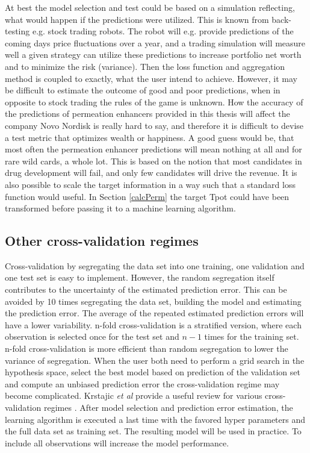 At best the model selection and test could be based on a simulation reflecting, what would happen if the predictions were utilized. This is known from back-testing e.g. stock trading robots. The robot will e.g. provide predictions of the coming days price fluctuations over a year, and a trading simulation will measure well a given strategy can utilize these predictions to increase portfolio net worth and to minimize the risk (variance). Then the loss function and aggregation method is coupled to exactly, what the user intend to achieve. However, it may be difficult to estimate the outcome of good and poor predictions, when in opposite to stock trading the rules of the game is unknown. How the accuracy of the predictions of permeation enhancers provided in this thesis will affect the company Novo Nordisk is really hard to say, and therefore it is difficult to devise a test metric that optimizes wealth or happiness. A good guess would be, that most often the permeation enhancer predictions will mean nothing at all and for rare wild cards, a whole lot. This is based on the notion that most candidates in drug development will fail, and only few candidates will drive the revenue. It is also possible to scale the target information in a way such that a standard loss function would useful. In Section \ref{calcPerm} the target Tpot could have been transformed before passing it to a machine learning algorithm. 

\subsection{Other cross-validation regimes}
Cross-validation by segregating the data set into one training, one validation and one test set is easy to implement. However, the random segregation itself contributes to the uncertainty of the estimated prediction error. This can be avoided by 10 times segregating the data set, building the model and estimating the prediction error. The average of the repeated estimated prediction errors will have a lower variability. n-fold cross-validation is a stratified version, where each observation is selected once for the test set and $n-1$ times for the training set. n-fold cross-validation is more efficient than random segregation to lower the variance of segregation. When the user both need to perform a grid search in the hypothesis space, select the best model based on prediction of the validation set and compute an unbiased  prediction error the cross-validation regime may become complicated. Krstajic \textit{et al} provide a useful review for various cross-validation regimes \cite{krstajic2014cross}. After model selection and prediction error estimation, the learning algorithm is executed a last time with the favored hyper parameters and the full data set as training set. The resulting model will be used in practice. To include all observations will increase the model performance.


